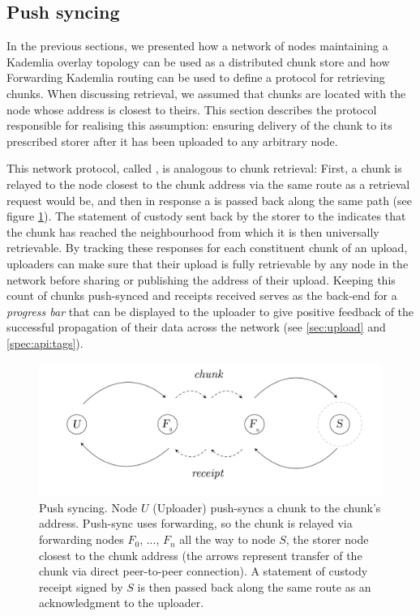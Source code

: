 \subsection{Push syncing\statusgreen}\label{sec:push-syncing}
 
In the previous sections, we presented how a network of nodes maintaining a Kademlia overlay topology can be used as a distributed chunk store and how Forwarding Kademlia routing can be used to define a protocol for retrieving chunks.
When discussing retrieval, we assumed that chunks are located with the node whose address is closest to theirs. This section describes the protocol responsible for realising this assumption: ensuring delivery of the chunk to its prescribed storer after it has been uploaded to any arbitrary node.

This network protocol, called , is analogous to chunk retrieval: First, a chunk is relayed to the node closest to the chunk address via the same route as a retrieval request would be, and then in response a  is passed back along the same path (see figure \ref{fig:push-syncing}). The statement of custody sent back by the storer to the  indicates that the chunk has reached the neighbourhood from which it is then universally retrievable. By tracking these responses for each constituent chunk of an upload, uploaders can make sure that their upload is fully retrievable by any node in the network before sharing or publishing the address of their upload. Keeping this count of chunks push-synced and receipts received serves as the back-end for a \emph{progress bar} that can be displayed to the uploader to give positive feedback of the successful propagation of their data across the network (see \ref{sec:upload} and \ref{spec:api:tags}).


\begin{figure}[htbp]
   \centering
   \includegraphics[width=\textwidth]{fig/push-sync.pdf}
   \caption[Push syncing \statusgreen]{Push syncing. Node $U$ (Uploader) push-syncs a chunk to the chunk's address. Push-sync uses forwarding, so the chunk is relayed via forwarding nodes $F_0$, ..., $F_n$ all the way to node $S$, the storer node closest to the chunk address (the arrows represent transfer of the chunk  via direct peer-to-peer connection). A statement of custody receipt signed by $S$ is then passed back along the same route as an acknowledgment to the uploader.}
   \label{fig:push-syncing}
\end{figure}

